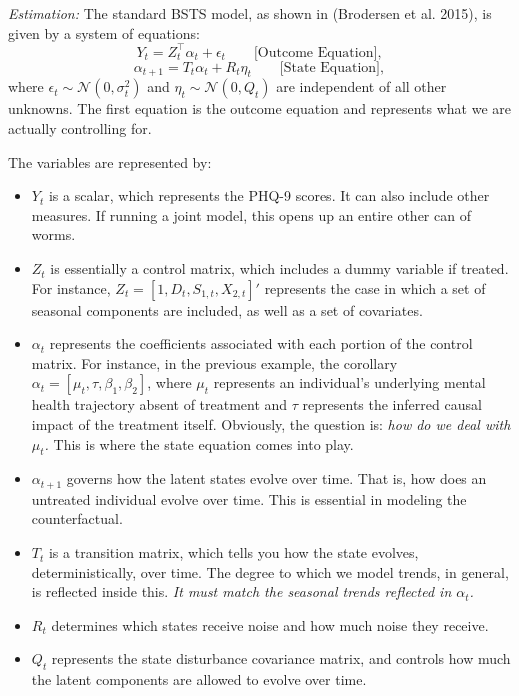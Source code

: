 \documentclass[12pt,letterpaper,doublespace, oneside]{article}
\begin{document}
\noindent

\emph{Estimation:} The standard BSTS model, as shown in (Brodersen et al. 2015), is given by a system of equations: 
\[
Y_t = Z_t^\top \alpha_t + \epsilon_t \qquad \text{[Outcome Equation]},
\]
\[
\alpha_{t+1} = T_t \alpha_t + R_t \eta_t \qquad \text{[State Equation]},
\]
where $\epsilon_t \sim \mathcal{N}(0,\sigma_t^2)$ and $\eta_t \sim \mathcal{N}(0,Q_t)$ are independent of all other unknowns. The first equation is the outcome equation and represents what we are actually controlling for. 

The variables are represented by: 
\begin{itemize}
\item $Y_t$ is a scalar, which represents the PHQ-9 scores. It can also include other measures. If running a joint model, this opens up an entire other can of worms.  

\item $Z_t$ is essentially a control matrix, which includes a dummy variable if treated. For instance, $Z_t = [1,D_t, S_{1,t}, X_{2,t}]'$ represents the case in which a set of seasonal components are included, as well as a set of covariates. 

\item $\alpha_t$ represents the coefficients associated with each portion of the control matrix. For instance, in the previous example, the corollary $\alpha_t = [\mu_t, \tau, \beta_1, \beta_2]$, where $\mu_t$ represents an individual's underlying mental health trajectory absent of treatment and $\tau$ represents the inferred causal impact of the treatment itself. Obviously, the question is: \emph{how do we deal with $\mu_t$.} This is where the state equation comes into play. 

\item $\alpha_{t+1}$ governs how the latent states evolve over time. That is, how does an untreated individual evolve over time. This is essential in modeling the counterfactual. 

\item $T_t$ is a transition matrix, which tells you how the state evolves, deterministically, over time. The degree to which we model trends, in general, is reflected inside this. \emph{It must match the seasonal trends reflected in $\alpha_t$.}

\item $R_t$ determines which states receive noise and how much noise they receive. 

\item $Q_t$ represents the state disturbance covariance matrix, and controls how much the latent components are allowed to evolve over time.

\end{itemize}
\end{document}
